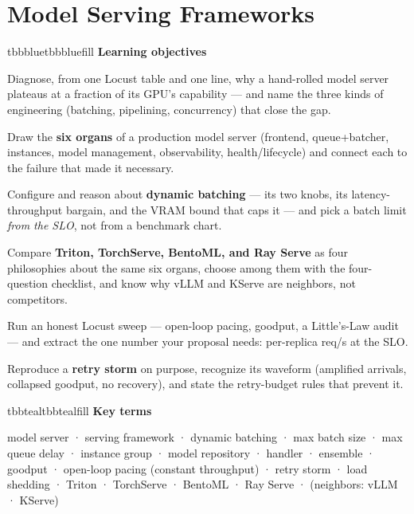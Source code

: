 \setcounter{chapter}{8}
\chapter{Model Serving Frameworks}

\begin{calloutbox}{tbbblue}{tbbbluefill}
{\normalsize\bfseries\color{tbbblue}Learning objectives}\par\vspace{3pt}
\begin{tbbitemize}
  \item Diagnose, from one Locust table and one  line, why a hand-rolled model server plateaus at a fraction of its GPU's capability — and name the three kinds of engineering (batching, pipelining, concurrency) that close the gap.
  \item Draw the \textbf{six organs} of a production model server (frontend, queue+batcher, instances, model management, observability, health/lifecycle) and connect each to the failure that made it necessary.
  \item Configure and reason about \textbf{dynamic batching} — its two knobs, its latency-throughput bargain, and the VRAM bound that caps it — and pick a batch limit \textit{from the SLO}, not from a benchmark chart.
  \item Compare \textbf{Triton, TorchServe, BentoML, and Ray Serve} as four philosophies about the same six organs, choose among them with the four-question checklist, and know why vLLM and KServe are neighbors, not competitors.
  \item Run an honest Locust sweep — open-loop pacing, goodput, a Little's-Law audit — and extract the one number your proposal needs: per-replica req/s at the SLO.
  \item Reproduce a \textbf{retry storm} on purpose, recognize its waveform (amplified arrivals, collapsed goodput, no recovery), and state the retry-budget rules that prevent it.
\end{tbbitemize}
\end{calloutbox}

\vspace{3.5pt}

\begin{calloutbox}{tbbteal}{tbbtealfill}
{\normalsize\bfseries\color{tbbteal}Key terms}\par\vspace{3pt}
model server · serving framework · dynamic batching · max batch size · max queue delay · instance group · model repository · handler · ensemble · goodput · open-loop pacing (constant throughput) · retry storm · load shedding · Triton · TorchServe · BentoML · Ray Serve · (neighbors: vLLM · KServe)
\end{calloutbox}

